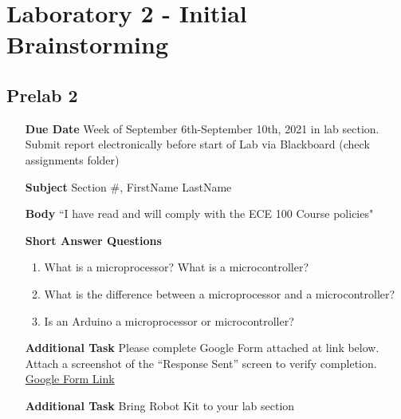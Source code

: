 \chapter{Laboratory 2 - Initial Brainstorming}
\section{Prelab 2}

\begin{itemize}
	\item[\textbf{Due Date}]{Week of September 6th-September 10th, 2021 in lab section. Submit report electronically before start of Lab via Blackboard (check assignments folder)}
	\item[\textbf{Subject}]{Section \#, FirstName LastName}
	\item[\textbf{Body}]{``I have read and will comply with the ECE 100 Course policies"}
	\item[\textbf{Short Answer Questions}]{
		\begin{enumerate}
			\item{What is a microprocessor? What is a microcontroller?}
			\item{What is the difference between a microprocessor and a microcontroller?}
			\item{Is an Arduino a microprocessor or microcontroller?}
		\end{enumerate}
	}
	\item[\textbf{Additional Task}]{Please complete Google Form attached at link below. Attach a screenshot of the “Response Sent” screen to verify completion. \href{https://docs.google.com/forms/d/1YDT2DtzWYms2BeuS1Wrks3ZANfYgNUmNhEl2PUm63Qc/prefill}{Google Form Link}}
	\item[\textbf{Additional Task}]{Bring Robot Kit to your lab section}
\end{itemize}
